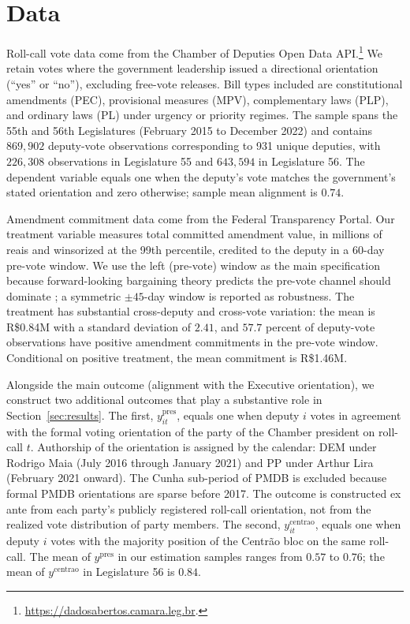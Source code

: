 \documentclass[preprint,12pt,authoryear]{elsarticle}
\begin{document}
\section{Data}
\label{sec:data}

Roll-call vote data come from the Chamber of Deputies Open Data API.\footnote{\url{https://dadosabertos.camara.leg.br}.} We retain votes where the government leadership issued a directional orientation (``yes'' or ``no''), excluding free-vote releases. Bill types included are constitutional amendments (PEC), provisional measures (MPV), complementary laws (PLP), and ordinary laws (PL) under urgency or priority regimes. The sample spans the 55th and 56th Legislatures (February 2015 to December 2022) and contains $869{,}902$ deputy-vote observations corresponding to 931 unique deputies, with $226{,}308$ observations in Legislature 55 and $643{,}594$ in Legislature 56. The dependent variable equals one when the deputy's vote matches the government's stated orientation and zero otherwise; sample mean alignment is $0.74$.

Amendment commitment data come from the Federal Transparency Portal. Our treatment variable measures total committed amendment value, in millions of reais and winsorized at the 99th percentile, credited to the deputy in a 60-day pre-vote window. We use the left (pre-vote) window as the main specification because forward-looking bargaining theory predicts the pre-vote channel should dominate \citep{Raile2011}; a symmetric $\pm 45$-day window is reported as robustness. The treatment has substantial cross-deputy and cross-vote variation: the mean is R\$0.84M with a standard deviation of $2.41$, and $57.7$ percent of deputy-vote observations have positive amendment commitments in the pre-vote window. Conditional on positive treatment, the mean commitment is R\$1.46M.

Alongside the main outcome (alignment with the Executive orientation), we construct two additional outcomes that play a substantive role in Section~\ref{sec:results}. The first, $y^{\mathrm{pres}}_{it}$, equals one when deputy $i$ votes in agreement with the formal voting orientation of the party of the Chamber president on roll-call $t$. Authorship of the orientation is assigned by the calendar: DEM under Rodrigo Maia (July 2016 through January 2021) and PP under Arthur Lira (February 2021 onward). The Cunha sub-period of PMDB is excluded because formal PMDB orientations are sparse before 2017. The outcome is constructed ex ante from each party's publicly registered roll-call orientation, not from the realized vote distribution of party members. The second, $y^{\mathrm{centrao}}_{it}$, equals one when deputy $i$ votes with the majority position of the Centr\~ao bloc on the same roll-call. The mean of $y^{\mathrm{pres}}$ in our estimation samples ranges from $0.57$ to $0.76$; the mean of $y^{\mathrm{centrao}}$ in Legislature 56 is $0.84$.
\end{document}

